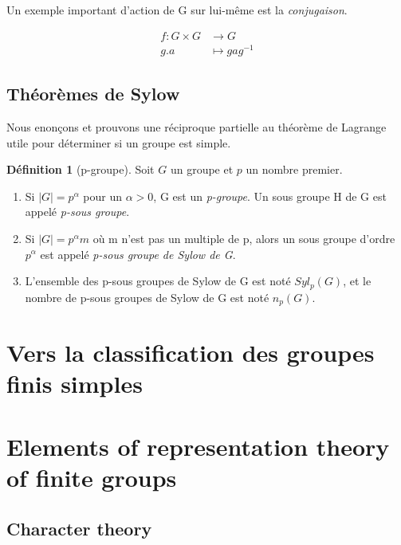 \documentclass[french]{article}
\theoremstyle{definition}
\newtheorem{definition}[subsubsection]{Définition}
\theoremstyle{plain}
\theoremstyle{plain}
\theoremstyle{plain}
\theoremstyle{plain}
\theoremstyle{plain}
\begin{document}
Un exemple important d'action de G sur lui-même est la \textit{conjugaison}.

\cite{serre1979ens}
\cite{chenevier2024ens}

\begin{align*}
	f : G \times G &\to G \\
	g . a &\mapsto gag^{-1}
\end{align*}
\subsection{Théorèmes de Sylow}

Nous enonçons et prouvons une réciproque partielle au théorème de Lagrange utile pour déterminer si un groupe est simple.

\begin{definition}[p-groupe]
	Soit \( G \) un groupe et \( p \) un nombre premier.
	\begin{enumerate}[label = (\roman*)]
	\item Si \( |G| = p^{\alpha} \) pour un \( \alpha > 0 \), G est un \textit{p-groupe}. Un sous groupe H de G est appelé \textit{p-sous groupe}.
	\item Si \( |G| = p^{\alpha}m \) où m n'est pas un multiple de p, alors un sous groupe d'ordre \( p^{\alpha} \) est appelé \textit{p-sous groupe de Sylow de G}.
	\item L'ensemble des p-sous groupes de Sylow de G est noté \( Syl_{p}(G) \), et le nombre de p-sous groupes de Sylow de G est noté \( n_{p}(G) \).
	\end{enumerate}
\end{definition}

\cite[p.~213]{chen2024napkin}

\section{Vers la classification des groupes finis simples}

\cite{dummit2003abstract}

\section{Elements of representation theory of finite groups}
\subsection{Character theory}

\clearpage
\printbibliography[heading=bibintoc]
\end{document}
